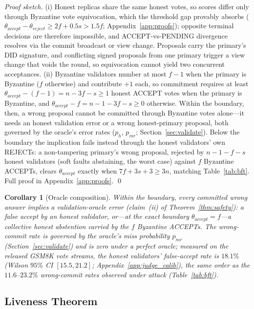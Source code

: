 \documentclass{article}
\newtheorem{corollary}[theorem]{Corollary}
\begin{document}
\begin{proof}[Proof sketch]
(i) Honest replicas share the same honest votes, so scores differ only through Byzantine vote equivocation, which the threshold gap provably absorbs ($\theta_{accept}-\theta_{reject} \geq 2f+0.5s > 1.5f$; Appendix~\ref{app:proofs}); opposite terminal decisions are therefore impossible, and ACCEPT-vs-PENDING divergence resolves via the commit broadcast or view change. Proposals carry the primary's DID signature, and conflicting signed proposals from one primary trigger a view change that voids the round, so equivocation cannot yield two concurrent acceptances. (ii) Byzantine validators number at most $f-1$ when the primary is Byzantine ($f$ otherwise) and contribute $+1$ each, so commitment requires at least $\theta_{accept}-(f{-}1) = n{-}3f{-}s \geq 1$ honest ACCEPT votes when the primary is Byzantine, and $\theta_{accept}-f = n{-}1{-}3f{-}s \geq 0$ otherwise. Within the boundary, then, a wrong proposal cannot be committed through Byzantine votes alone---it needs an honest validation error or a wrong honest-primary proposal, both governed by the oracle's error rates ($p_h$, $p_{\mathit{mr}}$; Section~\ref{sec:validate}). Below the boundary the implication fails instead through the honest validators' own REJECTs: a non-tampering primary's wrong proposal, rejected by $n{-}1{-}f{-}s$ honest validators (soft faults abstaining, the worst case) against $f$ Byzantine ACCEPTs, clears $\theta_{accept}$ exactly when $7f + 3s + 3 \geq 3n$, matching Table~\ref{tab:bft}. Full proof in Appendix~\ref{app:proofs}. \qed
\end{proof}

\begin{corollary}[Oracle composition]
\label{cor:oracle}
Within the boundary, every committed wrong answer implies a validation-oracle error (claim~(ii) of Theorem~\ref{thm:safety}): a false accept by an honest validator, or---at the exact boundary $\theta_{accept} = f$---a collective honest abstention carried by the $f$ Byzantine ACCEPTs. The wrong-commit rate is governed by the oracle's miss probability $p_{\mathit{mr}}$ (Section~\ref{sec:validate}) and is zero under a perfect oracle; measured on the released GSM8K vote streams, the honest validators' false-accept rate is $18.1\%$ (Wilson $95\%$ CI $[15.5, 21.2]$; Appendix~\ref{app:judge_calib}), the same order as the $11.6$--$23.2\%$ wrong-commit rates observed under attack (Table~\ref{tab:bft}).
\end{corollary}

\subsection{Liveness Theorem}
\end{document}
